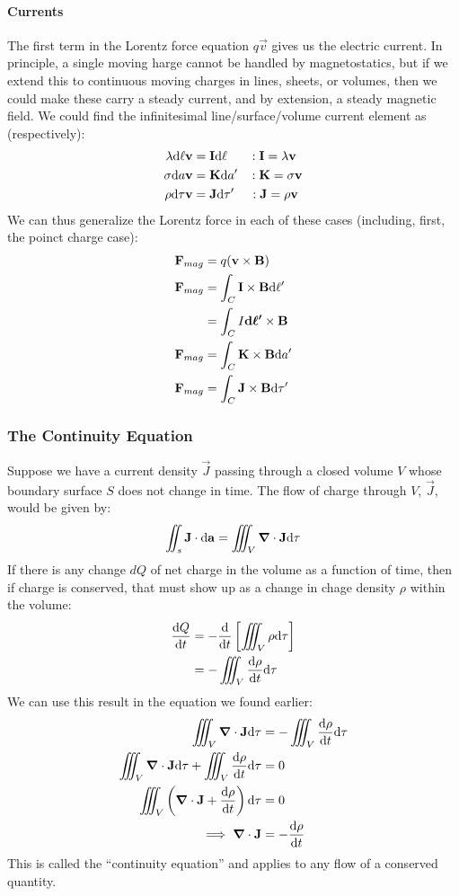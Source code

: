 \documentclass[a4paper]{article}
\begin{document}
\paragraph{Currents}
The first term in the Lorentz force equation $q\vec{v}$ gives us the electric
current.
In principle, a single moving harge cannot be handled by magnetostatics, but
if we extend this to continuous moving charges in lines, sheets, or volumes,
then we could make these carry a steady current, and by extension, a steady
magnetic field. We could find the infinitesimal line/surface/volume current
element as (respectively):
\begin{align*}
	\lambda\mathrm{d}\ell\boldsymbol{\mathbf{v}}&=\boldsymbol{\mathbf{I}}\mathrm{d}\ell\hspace{4ex}:\boldsymbol{\mathbf{I}}=\lambda\boldsymbol{\mathbf{v}}\\
	\sigma\mathrm{d} a\boldsymbol{\mathbf{v}}&=\boldsymbol{\mathbf{K}}\mathrm{d} a'\hspace{2ex}:\boldsymbol{\mathbf{K}}=\sigma\boldsymbol{\mathbf{v}}\\
	\rho\mathrm{d}\tau\boldsymbol{\mathbf{v}} &= \boldsymbol{\mathbf{J}}\mathrm{d}\tau'\hspace{2.8ex}:\boldsymbol{\mathbf{J}}=\rho\boldsymbol{\mathbf{v}}
\end{align*}
We can thus generalize the Lorentz force in each of these cases (including,
first, the poinct charge case):
\begin{align*}
	\boldsymbol{\mathbf{F}}_{mag} &= q(\boldsymbol{\mathbf{v}}\times\boldsymbol{\mathbf{B}})\\
	\boldsymbol{\mathbf{F}}_{mag}&=\int_C\boldsymbol{\mathbf{I}}\times\boldsymbol{\mathbf{B}}\mathrm{d}\ell'\\
		     &=\int_C I\boldsymbol{\mathbf{\mathrm{d}\ell'}}\times\boldsymbol{\mathbf{B}}\\
	\boldsymbol{\mathbf{F}}_{mag}&=\int_C\boldsymbol{\mathbf{K}}\times\boldsymbol{\mathbf{B}}\mathrm{d} a'\\
	\boldsymbol{\mathbf{F}}_{mag}&=\int_C\boldsymbol{\mathbf{J}}\times\boldsymbol{\mathbf{B}}\mathrm{d}\tau'\\
\end{align*}

\subsubsection{The Continuity Equation}
Suppose we have a current density $\vec{J}$ passing through a closed volume
$V$ whose boundary surface $S$ does not change in time. The flow of charge
through $V$, $\vec{J}$, would be given by:
\[ \iint_s \boldsymbol{\mathbf{J}}\cdot\mathrm{d}\boldsymbol{\mathbf{a}} = \iiint_V\boldsymbol{\mathbf{\nabla}}\cdot\boldsymbol{\mathbf{J}}\mathrm{d}\tau \]
If there is any change $dQ$ of net charge in the volume as a function of time,
then if charge is conserved, that must show up as a change in chage density
$\rho$ within the volume:
\begin{align*}
	\frac{\mathrm{d} Q}{\mathrm{d} t} &= -\frac{\mathrm{d} }{\mathrm{d} t}\left[\iiint_V\rho\mathrm{d}\tau\right]\\
		   &= -\iiint_V\frac{\mathrm{d} \rho}{\mathrm{d} t}\mathrm{d}\tau
\end{align*}
We can use this result in the equation we found earlier:
\begin{align*}
	 \iiint_V\boldsymbol{\mathbf{\nabla}}\cdot\boldsymbol{\mathbf{J}}\mathrm{d}\tau
		   &= -\iiint_V\frac{\mathrm{d} \rho}{\mathrm{d} t}\mathrm{d}\tau\\
	\iiint_V\boldsymbol{\mathbf{\nabla}}\cdot\boldsymbol{\mathbf{J}}\mathrm{d}\tau
	+\iiint_V\frac{\mathrm{d} \rho}{\mathrm{d} t}\mathrm{d}\tau &= 0\\
	\iiint_V\left(\boldsymbol{\mathbf{\nabla}}\cdot\boldsymbol{\mathbf{J}}+\frac{\mathrm{d} \rho}{\mathrm{d} t}\right)\mathrm{d}\tau&=0\\
	\implies \boldsymbol{\mathbf{\nabla}}\cdot\boldsymbol{\mathbf{J}} &= -\frac{\mathrm{d} \rho}{\mathrm{d} t}
\end{align*}
This is called the ``continuity equation'' and applies to any flow of a
conserved quantity.
\end{document}
